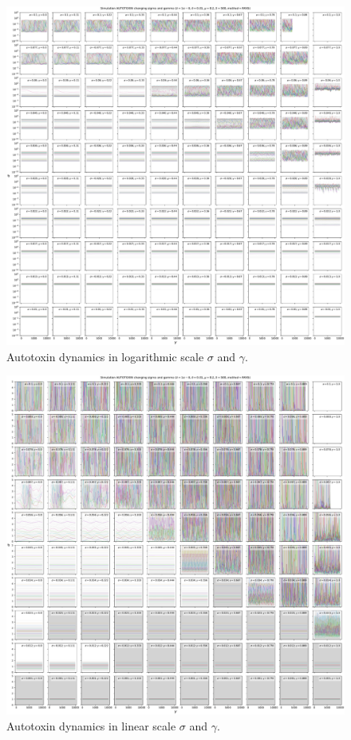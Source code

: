 \documentclass[11pt,a4paper,fleqn]{scrartcl}
\begin{document}
\clearpage

\begin{figure}[H]
    \centering
    \includegraphics[width=\linewidth]{SigmaGamma/10Autotox.pdf}
    \caption{Autotoxin dynamics in logarithmic scale $\sigma$ and $\gamma$.}
\end{figure}

\clearpage

\begin{figure}[H]
    \centering
    \includegraphics[width=\linewidth]{SigmaGamma/10AutotoxLinear.pdf}
    \caption{Autotoxin dynamics in linear scale $\sigma$ and $\gamma$.}
\end{figure}
\end{document}
